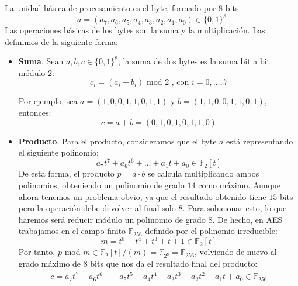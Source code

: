     La unidad básica de procesamiento es el byte, formado por $8$ bits.
    \begin{equation}
        a = (a_{7}, a_{6}, a_{5}, a_{4}, a_{3}, a_{2}, a_{1}, a_{0}) \in \{0, 1\}^{8}
    \end{equation}
    Las operaciones básicas de los bytes son la suma y la multiplicación. Las definimos de la siguiente forma:
    \begin{itemize}
        \item \textbf{Suma}. Sean $a, b, c \in \{0, 1\}^{8}$, la suma de dos bytes es la suma bit a bit módulo $2$:
        \begin{equation}
            c_{i} = (a_{i} + b_{i}) \text{ mod } 2 \text{ , con } i = 0, ... , 7
        \end{equation}
        \begin{ejemplo}
            Por ejemplo, sea $a = (1, 0, 0, 1, 1, 0, 1, 1)$ y $b = (1, 1, 0, 0, 1, 1, 0, 1)$, entonces: 
            \begin{equation}
                c = a + b = (0, 1, 0, 1, 0, 1, 1, 0)
            \end{equation}
        \end{ejemplo}
        \item \textbf{Producto}. Para el producto, consideramos que el byte $a$ está representando el siguiente polinomio:
        \begin{equation}
            a_{7}t^{7} + a_{6}t^{6} + \ldots + a_{1}t + a_{0} \in \mathbb{F}_{2}[t]
        \end{equation}
        De esta forma, el producto $p = a \cdot b$ se calcula multiplicando ambos polinomios, obteniendo un polinomio de grado $14$ como máximo. Aunque ahora tenemos un problema obvio, ya que el resultado obtenido tiene $15$ bits pero la operación debe devolver al final solo $8$. Para solucionar esto, lo que haremos será reducir módulo un polinomio de grado $8$. De hecho, en AES trabajamos en el campo finito $\mathbb{F}_{256}$ definido por el polinomio irreducible:
        \begin{equation}
            m = t^{8} + t^{4} + t^{3} + t + 1 \in \mathbb{F}_{2}[t]
        \end{equation}
        Por tanto, $p$ mod $m \in \mathbb{F}_{2}[t]/(m) = \mathbb{F}_{2^{8}} = \mathbb{F}_{256}$, volviendo de nuevo al grado máximo de $8$ bits que nos da el resultado final del producto:
        \begin{align}
            c = a_{7}t^{7} + a_{6}t^{6} + &a_{5}t^{5} + a_{4}t^{4} + a_{3}t^{3} + a_{2}t^{2} + a_{1}t + a_{0} \in \mathbb{F}_{256} \\

\end{align}
\end{itemize}
